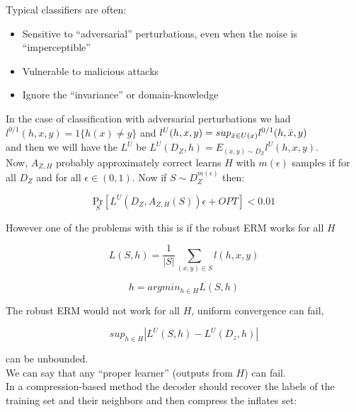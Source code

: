 \documentclass{article}
\begin{document}
\noindent Typical classifiers are often:

\begin{itemize}
    \item Sensitive to “adversarial” perturbations, even when the noise is “imperceptible”
    \item Vulnerable to malicious attacks
    \item Ignore the “invariance” or domain-knowledge
\end{itemize}

\noindent In the case of classification with adversarial perturbations we had $l^{0/1}(h,x,y) = 1 \{h(x) \neq y\}$ and $l^U(h,x,y) = sup_{\Bar{x} \in U(x)} l^{0/1}(h,\Bar{x},y)$\\

\noindent and then we will have the $L^U$ be $L^U(D_Z,h) = E_{(x,y) \sim D_Z} l^U(h,x,y)$.\\

\noindent Now, $A_{Z,H}$ probably approximately correct learns $H$ with $m(\epsilon)$ samples if for all $D_Z$ and for all $\epsilon \in ( 0,1 )$. Now if $S \sim D_Z^{m(\epsilon)}$ then:

\begin{equation}
    \underset{S}{\mathrm{Pr}} [L^U(D_Z, A_{Z,H}(S)) \epsilon + OPT] < 0.01
\end{equation}

\noindent However one of the problems with this is if the robust ERM works for all $H$

\begin{equation*}
    L(S,h) = \frac{1}{|S|} \sum_{(x,y)\in S} l(h,x,y)
\end{equation*}

\begin{equation*}
    h = argmin_{h \in H} L(S,h)
\end{equation*}

\noindent The robust ERM would not work for all $H$, uniform convergence can fail,

\begin{equation*}
    sup_{h \in H} |L^U(S,h) - L^U(D_z, h)|
\end{equation*}

\noindent can be unbounded.\\

\noindent We can say that any “proper learner” (outputs from $H$) can fail.\\

\noindent In a compression-based method the decoder should recover the labels
of the training set and their neighbors and then compress the inflates set:
\end{document}
